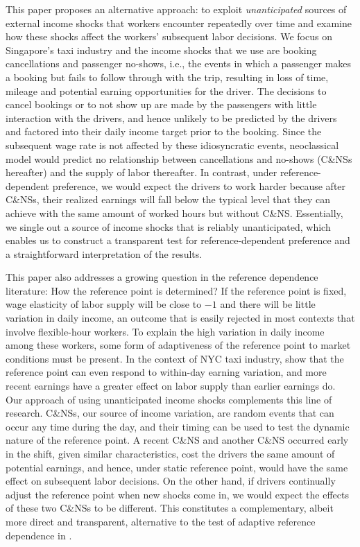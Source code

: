 \documentclass[reviewmode]{restud}
\begin{document}
This paper proposes an alternative approach: to exploit \textit{unanticipated} sources of external income shocks that workers encounter repeatedly over time and examine how these shocks affect the workers' subsequent labor decisions. We focus on Singapore's taxi industry and the income shocks that we use are booking cancellations and passenger no-shows, i.e., the events in which a passenger makes a booking but fails to follow through with the trip, resulting in loss of time, mileage and potential earning opportunities for the driver. The decisions to cancel bookings or to not show up are made by the passengers with little interaction with the drivers, and hence unlikely to be predicted by the drivers and factored into their daily income target prior to the booking. Since the subsequent wage rate is not affected by these idiosyncratic events, neoclassical model would predict no relationship between cancellations and no-shows (C\&NSs hereafter) and the supply of labor thereafter. In contrast, under reference-dependent preference, we would expect  the drivers to work harder because after C\&NSs, their realized earnings will fall below the typical level that they can achieve with the same amount of worked hours but without C\&NS. Essentially, we single out a source of income shocks that is reliably unanticipated, which enables us to construct a transparent test for reference-dependent preference and a straightforward interpretation of the results.


This paper also addresses a growing question in the reference dependence literature: How the reference point is determined? If the reference point is fixed, wage elasticity of labor supply will be close to $-1$ and there will be little variation in daily income, an outcome that is  easily rejected in most contexts that involve flexible-hour workers. To explain the high variation in daily income among these workers, some form of adaptiveness of the reference point to market conditions must be present. In the context of NYC taxi industry, \citet{thakral2018daily} show that the reference point can even respond to within-day earning variation, and more recent earnings have a greater effect on labor supply than earlier earnings do. Our approach of using unanticipated income shocks complements this line of research. C\&NSs, our source of income variation, are random events that can occur any time during the day, and their timing can be used to test the dynamic nature of the reference point. A recent C\&NS and another C\&NS occurred early in the shift, given similar characteristics, cost the drivers the same amount of potential earnings, and hence, under static reference point, would have the same effect on subsequent labor decisions. On the other hand, if drivers continually adjust the reference point when new shocks come in, we would expect the effects of these two C\&NSs to be different. This constitutes a complementary, albeit more direct and transparent, alternative to the test of adaptive reference dependence in \citet{thakral2018daily}. 
\end{document}
